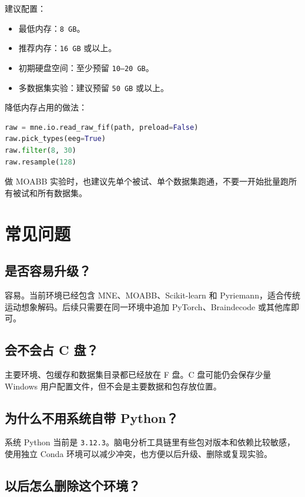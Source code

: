 \documentclass[UTF8,a4paper,12pt]{ctexart}
\begin{document}
建议配置：

\begin{itemize}
  \item 最低内存：\texttt{8 GB}。
  \item 推荐内存：\texttt{16 GB} 或以上。
  \item 初期硬盘空间：至少预留 \texttt{10--20 GB}。
  \item 多数据集实验：建议预留 \texttt{50 GB} 或以上。
\end{itemize}

降低内存占用的做法：

\begin{lstlisting}[language=Python,caption={降低 EEG 处理内存占用的常用做法}]
raw = mne.io.read_raw_fif(path, preload=False)
raw.pick_types(eeg=True)
raw.filter(8, 30)
raw.resample(128)
\end{lstlisting}

做 MOABB 实验时，也建议先单个被试、单个数据集跑通，不要一开始批量跑所有被试和所有数据集。

\section{常见问题}

\subsection{是否容易升级？}

容易。当前环境已经包含 MNE、MOABB、Scikit-learn 和 Pyriemann，适合传统运动想象解码。后续只需要在同一环境中追加 PyTorch、Braindecode 或其他库即可。

\subsection{会不会占 C 盘？}

主要环境、包缓存和数据集目录都已经放在 F 盘。C 盘可能仍会保存少量 Windows 用户配置文件，但不会是主要数据和包存放位置。

\subsection{为什么不用系统自带 Python？}

系统 Python 当前是 \texttt{3.12.3}。脑电分析工具链里有些包对版本和依赖比较敏感，使用独立 Conda 环境可以减少冲突，也方便以后升级、删除或复现实验。

\subsection{以后怎么删除这个环境？}
\end{document}
